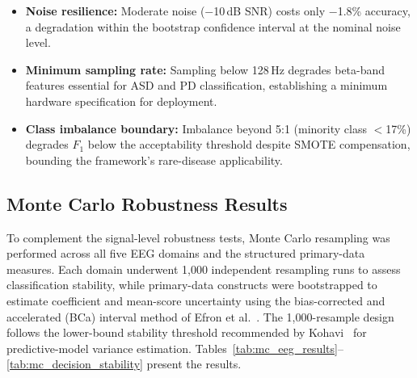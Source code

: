 \begin{itemize}[leftmargin=*, itemsep=3pt]
    \item \textbf{Noise resilience:} Moderate noise ($-$10\,dB SNR) costs only $-$1.8\% accuracy, a degradation within the bootstrap confidence interval at the nominal noise level.
    \item \textbf{Minimum sampling rate:} Sampling below 128\,Hz degrades beta-band features essential for ASD and PD classification, establishing a minimum hardware specification for deployment.
    \item \textbf{Class imbalance boundary:} Imbalance beyond 5:1 (minority class $<$17\%) degrades $F_1$ below the acceptability threshold despite SMOTE compensation, bounding the framework's rare-disease applicability.
\end{itemize}
\fi %


\subsection{Monte Carlo Robustness Results}

To complement the signal-level robustness tests, Monte Carlo resampling was performed across all five EEG domains and the structured primary-data measures. Each domain underwent 1,000 independent resampling runs to assess classification stability, while primary-data constructs were bootstrapped to estimate coefficient and mean-score uncertainty using the bias-corrected and accelerated (BCa) interval method of Efron et al.~\cite{efron1993bootstrap}. The 1,000-resample design follows the lower-bound stability threshold recommended by Kohavi~\cite{kohavi1995crossvalidation} for predictive-model variance estimation. Tables~\ref{tab:mc_eeg_results}--\ref{tab:mc_decision_stability} present the results.

